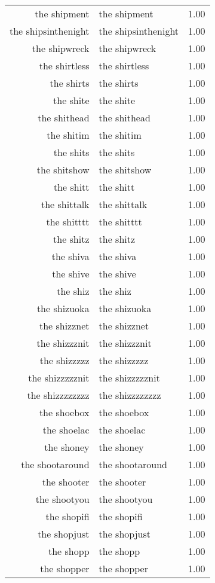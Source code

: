 \begin{table}[ht]
\begin{tabular}{rlr}
  the shipment & the shipment & 1.00 \\ 
  the shipsinthenight & the shipsinthenight & 1.00 \\ 
  the shipwreck & the shipwreck & 1.00 \\ 
  the shirtless & the shirtless & 1.00 \\ 
  the shirts & the shirts & 1.00 \\ 
  the shite & the shite & 1.00 \\ 
  the shithead & the shithead & 1.00 \\ 
  the shitim & the shitim & 1.00 \\ 
  the shits & the shits & 1.00 \\ 
  the shitshow & the shitshow & 1.00 \\ 
  the shitt & the shitt & 1.00 \\ 
  the shittalk & the shittalk & 1.00 \\ 
  the shitttt & the shitttt & 1.00 \\ 
  the shitz & the shitz & 1.00 \\ 
  the shiva & the shiva & 1.00 \\ 
  the shive & the shive & 1.00 \\ 
  the shiz & the shiz & 1.00 \\ 
  the shizuoka & the shizuoka & 1.00 \\ 
  the shizznet & the shizznet & 1.00 \\ 
  the shizzznit & the shizzznit & 1.00 \\ 
  the shizzzzz & the shizzzzz & 1.00 \\ 
  the shizzzzznit & the shizzzzznit & 1.00 \\ 
  the shizzzzzzzz & the shizzzzzzzz & 1.00 \\ 
  the shoebox & the shoebox & 1.00 \\ 
  the shoelac & the shoelac & 1.00 \\ 
  the shoney & the shoney & 1.00 \\ 
  the shootaround & the shootaround & 1.00 \\ 
  the shooter & the shooter & 1.00 \\ 
  the shootyou & the shootyou & 1.00 \\ 
  the shopifi & the shopifi & 1.00 \\ 
  the shopjust & the shopjust & 1.00 \\ 
  the shopp & the shopp & 1.00 \\ 
  the shopper & the shopper & 1.00 \\ 

\end{tabular}
\end{table}

